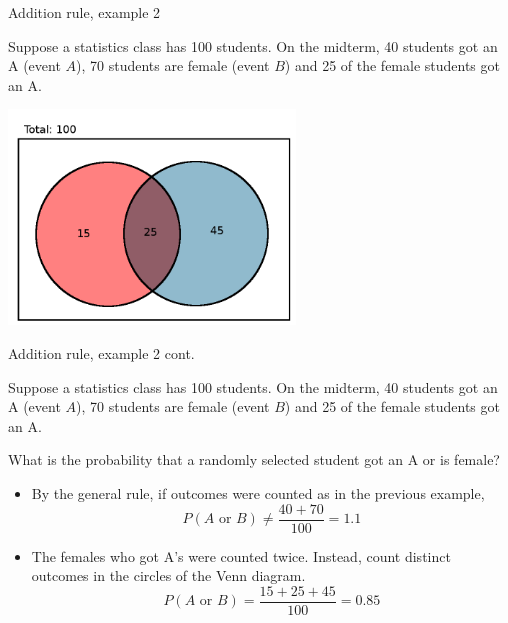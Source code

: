 \documentclass[xcolor=table, handout]{beamer}
\begin{document}
\begin{frame}{Addition rule, example 2}
\begin{block}{}
Suppose a statistics class has 100 students. On the midterm, 40 students got an A (event $A$),  70 students are female (event $B$) and 25 of the female students got an A.
\end{block}

{\centering
\includegraphics[width=3in]{../images/ch4_venn_ovr_ex}\par
}
\end{frame}

\begin{frame}{Addition rule, example 2 cont.}
\begin{block}{}
Suppose a statistics class has 100 students. On the midterm, 40 students got an A (event $A$),  70 students are female (event $B$) and 25 of the female students got an A.
\end{block}
\begin{exampleblock}{}
What is the probability that a randomly selected student got an A or is female?
\begin{itemize}
\pause
\item By the general rule, if outcomes were counted as in the previous example,
\[P(A \text{ or } B) \ne \frac {40 + 70}{100} = 1.1\]

\pause
\item The females who got A's were counted twice. Instead, count distinct outcomes in the circles of the Venn diagram.
\[P(A \text{ or } B) = \frac {15 + 25 + 45}{100} = 0.85\]

\end{itemize}
\end{exampleblock}

\end{frame}
\end{document}
